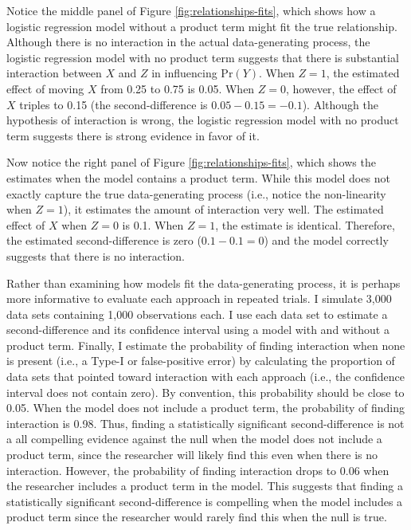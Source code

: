 \documentclass[12pt]{article}
\begin{document}
Notice the middle panel of Figure \ref{fig:relationships-fits}, which shows how a logistic regression model without a product term might fit the true relationship. Although there is no interaction in the actual data-generating process, the logistic regression model with no product term suggests that there is  substantial interaction between $X$ and $Z$ in influencing $\text{Pr}(Y)$. When $Z=1$, the estimated effect of moving $X$ from 0.25 to 0.75 is 0.05. When $Z=0$, however, the effect of $X$ triples to 0.15 (the second-difference is $0.05 - 0.15 = -0.1$). Although the hypothesis of interaction is wrong, the logistic regression model with no product term suggests there is strong evidence in favor of it.

Now notice the right panel of Figure \ref{fig:relationships-fits}, which shows the estimates when the model contains a product term. While this model does not exactly capture the true data-generating process (i.e., notice the non-linearity when $Z = 1$), it estimates the amount of interaction very well. The estimated effect of $X$ when $Z=0$  is 0.1. When $Z = 1$, the estimate is identical. Therefore, the estimated second-difference is zero ($0.1 - 0.1 = 0$) and the model correctly suggests that there is no interaction.

Rather than examining how models fit the data-generating process, it is perhaps more informative to evaluate each approach in repeated trials. I simulate 3,000 data sets containing 1,000 observations each. I use each data set to estimate a second-difference and its confidence interval using a model with and without a product term. Finally, I estimate the probability of finding interaction when none is present (i.e., a Type-I or false-positive error) by calculating the proportion of data sets that pointed toward interaction with each approach (i.e., the confidence interval does not contain zero). By convention, this probability should be close to 0.05. When the model does not include a product term, the probability of finding interaction is 0.98. Thus,  finding a statistically significant second-difference is not a all  compelling evidence against the null when the model does not include a product term, since the researcher will likely find this even when there is no interaction. However, the probability of finding interaction drops to 0.06 when the researcher includes a product term in the model. This suggests that finding a statistically significant second-difference is compelling  when the model includes a product term since the researcher would rarely find this when the null is true.
\end{document}
